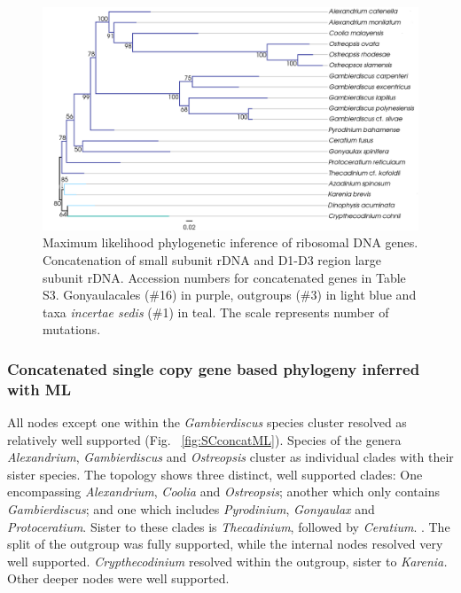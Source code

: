 \documentclass[12pt]{article}
\begin{document}
\begin{figure} 
\includegraphics[scale=.4]{figures/rDNA-ML.png} 
\caption{Maximum likelihood phylogenetic inference of ribosomal DNA genes. Concatenation of small subunit rDNA and D1-D3 region large subunit rDNA. Accession numbers for concatenated genes in Table S3. Gonyaulacales (\#16) in purple, outgroups (\#3) in light blue and taxa \textit{incertae sedis} (\#1) in teal. The scale represents number of mutations.} 
\label{fig:rdna}
\end{figure} 
\FloatBarrier

\subsubsection*{Concatenated single copy gene based phylogeny inferred with ML}
\FloatBarrier
All nodes except one within the \emph{Gambierdiscus} species cluster resolved as relatively well supported (Fig. ~\ref{fig:SCconcatML}). 
Species of the genera \emph{Alexandrium}, \emph{Gambierdiscus} and \emph{Ostreopsis} cluster as individual clades with their sister species.  
The topology shows three distinct, well supported clades: 
One encompassing \emph{Alexandrium}, \emph{Coolia} and \emph{Ostreopsis}; another which only contains \emph{Gambierdiscus}; and one which includes \emph{Pyrodinium}, \emph{Gonyaulax} and \emph{Protoceratium}. 
Sister to these clades is \emph{Thecadinium}, followed by \emph{Ceratium}. .
The split of the outgroup was fully supported, while the internal nodes resolved very well supported. 
\emph{Crypthecodinium} resolved within the outgroup, sister to \emph{Karenia.} 
Other deeper nodes were well supported.
 
\end{document}
